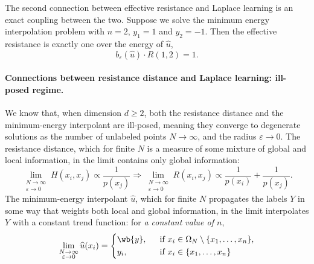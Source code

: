 \documentclass{article}
\newcommand{\1}{\mathbf{1}}
\newcommand{\wh}[1]{\widehat{#1}}
\theoremstyle{definition}
\theoremstyle{remark}
\begin{document}
The second connection between effective resistance and Laplace learning is an exact coupling between the two. Suppose we solve the minimum energy interpolation problem with $n = 2$, $y_1 = 1$ and $y_2 = -1$. Then the effective resistance is exactly one over the energy of $\wh{u}$,
\begin{equation*}
b_{\varepsilon}(\wh{u}) \cdot R(1,2) = 1.
\end{equation*}

\paragraph{Connections between resistance distance and Laplace learning: ill-posed regime.}
We know that, when dimension $d \geq 2$, both the resistance distance and the minimum-energy interpolant are ill-posed, meaning they converge to degenerate solutions as the number of unlabeled points $N \to \infty$, and the radius $\varepsilon \to 0$. The resistance distance, which for finite $N$ is a measure of some mixture of global and local information, in the limit contains only global information:
\begin{equation}
\label{eqn:resistance_distance_illposed}
\lim_{\substack{N \to \infty \\ \varepsilon \to 0}}H(x_i,x_j) \propto \frac{1}{p(x_j)} \Longrightarrow \lim_{\substack{N \to \infty \\ \varepsilon \to 0}} R(x_i,x_j) \propto \frac{1}{p(x_i)} + \frac{1}{p(x_j)}.
\end{equation}
The minimum-energy interpolant $\wh{u}$, which for finite $N$ propagates the labels $Y$ in some way that weights both local and global information, in the limit interpolates $Y$ with a constant trend function: for \emph{a constant value of $n$}, 
\begin{equation}
\label{eqn:min_energy_interpolant_illposed}
\lim_{\substack{N \to \infty \\ \varepsilon \to 0}} \wh{u}(x_i) = 
\begin{cases*}
\wb{y},& ~~\textrm{if $x_i \in \Omega_N\setminus\{x_1,\ldots,x_n\}$},\\
y_i,& ~~\textrm{if $x_i \in \{x_1,\ldots,x_n\}$}
\end{cases*}
\end{equation}
\end{document}
